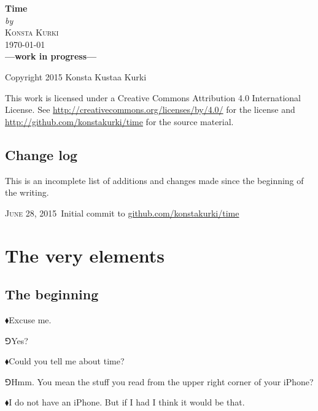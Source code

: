 \documentclass[10pt,oneside%
]{memoir}
\newenvironment{narration}{\begin{em}}{\end{em}}
\newcommand{\hea}{\(\blacklozenge\)\;}
\newcommand{\heb}{\(\Game\)\;}
\begin{document}
\frontmatter
\begin{titlingpage}
	\begin{centering}
		\HUGE\textbf{Time}\\
		\vspace{0.4em}
		\normalsize\emph{by}\\
		\vspace{0.4em}
		\textsc{Konsta Kurki}\\
		\vspace{0.4em}
		\textsc{\today}\\
		\vspace{5em}
		\textbf{---work in progress---}\\
	\end{centering}
	\vfill

	Copyright {\textcopyright} 2015 Konsta Kustaa Kurki

	This work is licensed under a Creative Commons Attribution 4.0 International License. See \url{http://creativecommons.org/licenses/by/4.0/} for the license and \url{http://github.com/konstakurki/time} for the source material.
\end{titlingpage}
\chapter{Change log}
\begin{narration}
This is an incomplete list of additions and changes made since the beginning of the writing.
\end{narration}


\textsc{June 28, 2015}\, Initial commit to \url{github.com/konstakurki/time}

\newpage
\tableofcontents
\mainmatter
{}
\part{The very elements}
\chapter{The beginning}
\hea Excuse me.

\heb Yes?

\hea Could you tell me about time?

\heb Hmm. You mean the stuff you read from the upper right corner of your iPhone?

\hea I do not have an iPhone. But if I had I think it would be that.
\end{document}

